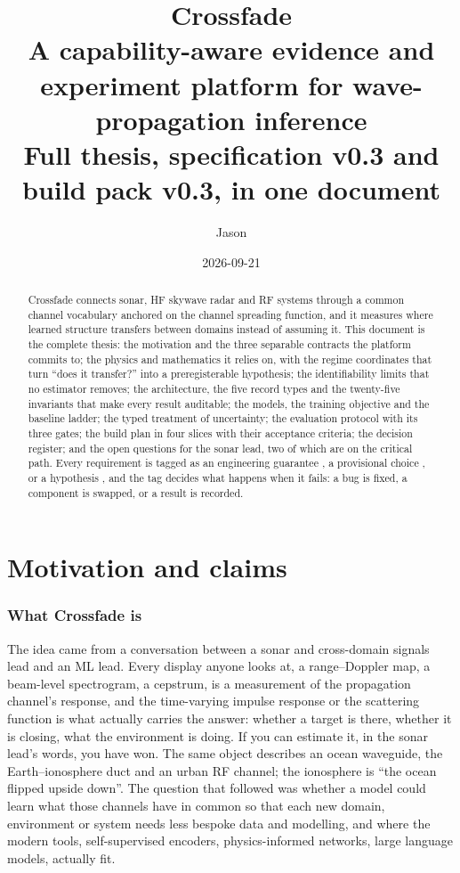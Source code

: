 \documentclass[11pt,a4paper]{article}
\title{Crossfade\\[4pt]\large A capability-aware evidence and experiment platform for wave-propagation inference\\[2pt]\normalsize Full thesis, specification v0.3 and build pack v0.3, in one document}
\author{Jason}
\date{2026-09-21}
\begin{document}
\maketitle

\begin{abstract}
\noindent Crossfade connects sonar, HF skywave radar and RF systems through a common channel vocabulary anchored on the channel spreading function, and it measures where learned structure transfers between domains instead of assuming it. This document is the complete thesis: the motivation and the three separable contracts the platform commits to; the physics and mathematics it relies on, with the regime coordinates that turn ``does it transfer?'' into a preregisterable hypothesis; the identifiability limits that no estimator removes; the architecture, the five record types and the twenty-five invariants that make every result auditable; the models, the training objective and the baseline ladder; the typed treatment of uncertainty; the evaluation protocol with its three gates; the build plan in four slices with their acceptance criteria; the decision register; and the open questions for the sonar lead, two of which are on the critical path. Every requirement is tagged as an engineering guarantee \tagG{}, a provisional choice \tagP{}, or a hypothesis \tagH{}, and the tag decides what happens when it fails: a bug is fixed, a component is swapped, or a result is recorded.
\end{abstract}

\tableofcontents
\clearpage

\part{Motivation and claims}

\section{What Crossfade is}

The idea came from a conversation between a sonar and cross-domain signals lead and an ML lead. Every display anyone looks at, a range--Doppler map, a beam-level spectrogram, a cepstrum, is a measurement of the propagation channel's response, and the time-varying impulse response or the scattering function is what actually carries the answer: whether a target is there, whether it is closing, what the environment is doing. If you can estimate it, in the sonar lead's words, you have won. The same object describes an ocean waveguide, the Earth--ionosphere duct and an urban RF channel; the ionosphere is ``the ocean flipped upside down''. The question that followed was whether a model could learn what those channels have in common so that each new domain, environment or system needs less bespoke data and modelling, and where the modern tools, self-supervised encoders, physics-informed networks, large language models, actually fit.
\end{document}
